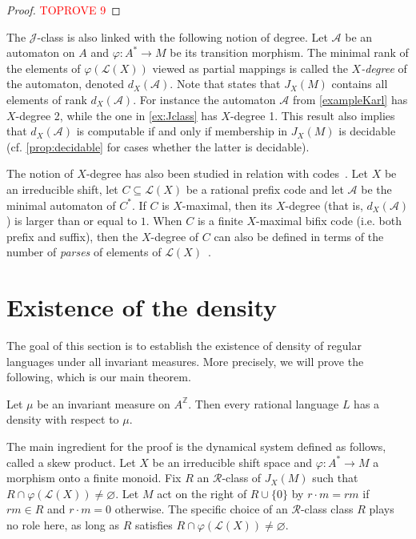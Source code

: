 \documentclass[a4paper,UKenglish,numberwithinsect,cleveref]{lipics-v2021}
\newcommand{\JJ}{\mathrel{\mathscr{J}}}
\newcommand{\RR}{\mathrel{\mathscr{R}}}
\newcommand{\A}{\mathcal A}
\newcommand{\Z}{\mathbb{Z}}
\newcommand{\cL}{\mathcal L}
\newcommand*{\from}{\colon}
\begin{document}
\begin{proof}\textcolor{red}{TOPROVE 9}\end{proof}


The $\JJ$-class is also linked with the following notion of degree. Let $\A$ be an automaton on $A$ and $\varphi\from A^*\to M$ be its transition morphism. The minimal rank of the elements of $\varphi(\cL(X))$ viewed as partial mappings is called the \emph{$X$-degree} of the automaton, denoted $d_X(\A)$. Note that \cite[Proposition~3.2]{Perrin2015} states that $J_X(M)$ contains all elements of rank $d_X(\A)$. For instance the automaton $\A$ from \cref{exampleKarl} has $X$-degree 2, while the one in \cref{ex:Jclass} has $X$-degree 1. This result also implies that $d_X(\A)$ is computable if and only if membership in $J_X(M)$ is decidable (cf.  \cref{prop:decidable} for cases whether the latter is decidable).


The notion of $X$-degree has also been studied in relation with codes~\cite{BerstelDeFelicePerrinReutenauerRindone2012,Almeida2020}. Let $X$ be an irreducible shift, let $C\subseteq\cL(X)$ be a rational prefix code and let $\A$ be the minimal automaton of $C^*$.  If $C$ is $X$-maximal, then its $X$-degree (that is, $d_X(\A)$) is larger than or equal to $1$. When $C$ is a finite $X$-maximal bifix code (i.e. both prefix and suffix),  then the $X$-degree of $C$ can also be defined in terms of the number of \emph{parses} of elements of  $\cL(X)$~\cite{BerstelDeFelicePerrinReutenauerRindone2012}. 

\section{Existence of  the density}
\label{sec:existence}
    
The goal of this section is to establish the existence of density of regular languages under all invariant measures. More precisely, we will prove the following, which is our main theorem. 
\begin{theorem}\label{theoremMain}
    Let $\mu$ be an invariant measure on $A^\Z$. Then every rational language $L$ has a density with respect to $\mu$. 
\end{theorem}

The main ingredient for the proof is the dynamical system defined as follows, called a skew product. Let $X$ be an irreducible shift space and $\varphi\colon A^*\to M$ a morphism onto a finite monoid. Fix $R$ an $\RR$-class of $J_X(M)$ such that $R\cap\varphi(\cL(X))\neq\varnothing$. Let $M$ act on the right of $R\cup\{0\}$ by $r\cdot m = rm$ if $rm\in R$ and $r\cdot m=0$ otherwise. 
The  specific choice  of  an $\RR$-class class $R$ plays no role here, as long as $R$ satisfies $R\cap\varphi(\cL(X))\neq\varnothing$.
\end{document}
